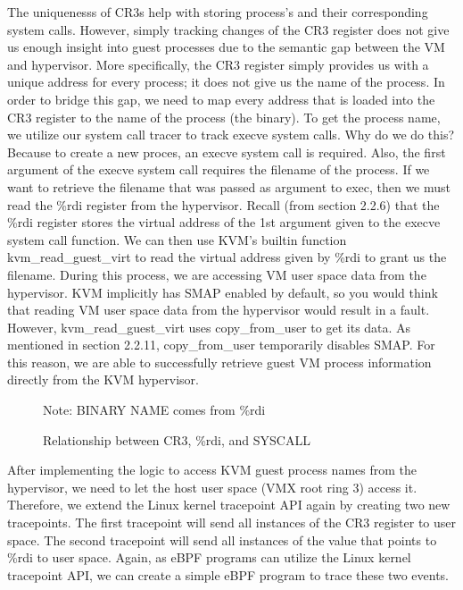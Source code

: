 \documentclass{report}
\begin{document}
\begin{spacing}{1.5}
{\large
\noindent The uniquenesss of CR3s help with storing process's and their corresponding system calls. However, simply tracking changes of the CR3 register does not give us enough insight into guest processes due to the semantic gap between the VM and hypervisor. More specifically, the CR3 register simply provides us with a unique address for every process; it does not give us the name of the process. In order to bridge this gap, we need to map every address that is loaded into the CR3 register to the name of the process (the binary). To get the process name, we utilize our system call tracer to track execve system calls. Why do we do this? Because to create a new proces, an execve system call is required. Also, the first argument of the execve system call requires the filename of the process. If we want to retrieve the filename that was passed as argument to exec, then we must read the \%rdi register from the hypervisor. Recall (from section 2.2.6) that the \%rdi register stores the virtual address of the 1st argument given to the execve system call function. We can then use KVM's builtin function kvm\_read\_guest\_virt to read the virtual address given by \%rdi to grant us the filename. During this process, we are accessing VM user space data from the hypervisor. KVM implicitly has SMAP enabled by default, so you would think that reading VM user space data from the hypervisor would result in a fault. However, kvm\_read\_guest\_virt uses copy\_from\_user to get its data. As mentioned in section 2.2.11, copy\_from\_user temporarily disables SMAP. For this reason, we are able to successfully retrieve guest VM process information directly from the KVM hypervisor.
}



\begin{figure}[ht]
    \hspace*{-2cm}  
    \centering
    \caption{Relationship between CR3, \%rdi, and SYSCALL}{Note: BINARY NAME comes from \%rdi}
\end{figure}


{\large
\noindent After implementing the logic to access KVM guest process names from the hypervisor, we need to let the host user space (VMX root ring 3) access it. Therefore, we extend the Linux kernel tracepoint API again by creating two new tracepoints. The first tracepoint will send all instances of the CR3 register to user space. The second tracepoint will send all instances of the value that points to \%rdi to user space. Again, as eBPF programs can utilize the Linux kernel tracepoint API, we can create a simple eBPF program to trace these two events.  
\newline
}




\end{spacing}
\end{document}
